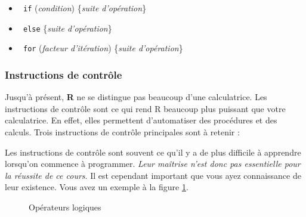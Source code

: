 \documentclass[10.5pt,a4paper]{article}
\newcommand{\rcode}[1]{\texttt{\color{rstudio} #1}}
\begin{document}
       \begin{itemize}
      \item \rcode{if} (\emph{condition}) \{\emph{suite d'opération}\}
      \item \rcode{else} \{\emph{suite d'opération}\}
      \item \rcode{for} (\emph{facteur d'itération}) \{\emph{suite d'opération}\}
    \end{itemize}
     
    \subsubsection{Instructions de contrôle}
  Jusqu'à présent, \textbf{R} ne se distingue pas beaucoup d'une calculatrice. Les instructions de contrôle sont ce qui rend R beaucoup plus puissant que votre calculatrice. En effet, elles permettent d'automatiser des procédures et des calculs. Trois instructions de contrôle principales sont à retenir :
    
    Les instructions de contrôle sont souvent ce qu'il y a de plus difficile à apprendre lorsqu'on commence à programmer. \emph{Leur maîtrise n'est donc pas essentielle pour la réussite de ce cours}. Il est cependant important que vous ayez connaissance de leur existence. Vous avez un exemple à la figure \ref{opeLogi}. %
    
    
    \begin{figure}[H]
    \centering
    \caption{Opérateurs logiques}
    \label{opeLogi}
    \end{figure}
    
\end{document}
